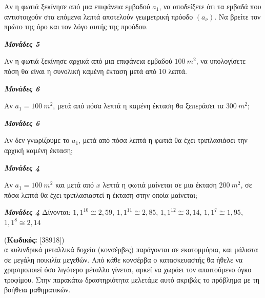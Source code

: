 \documentclass[11pt,a4paper,twoside]{book}
\newcounter{askhsh}[chapter]
\renewcommand{\theaskhsh}{
	\bf{\titlefont{\Large{\thechapter}}.\arabic{askhsh}}
}
\newcommand{\Askhsh}[2]{\refstepcounter{askhsh}{\titlefont{Άσκηση\theaskhsh} - \textcolor{maincolor}{ΘΕΜΑ #2}} (\small{\textbf{Κωδικός:} #1})\\}{}
\newcommand{\monades}[1]{
\hspace*{\fill}
\textbf{\textit{\textcolor{maincolor}{Μονάδες #1}}}}
\begin{document}
\begin{alist}
\item Αν η φωτιά ξεκίνησε από μια επιφάνεια εμβαδού $a_1$, να αποδείξετε ότι τα εμβαδά που αντιστοιχούν στα επόμενα λεπτά αποτελούν γεωμετρική πρόοδο $(a_\nu)$. Να βρείτε τον πρώτο της όρο και τον λόγο αυτής της προόδου.
\monades{5}
\item Αν η φωτιά ξεκίνησε αρχικά από μια επιφάνεια εμβαδού $100\ m^2$, να υπολογίσετε πόση θα είναι η συνολική καμένη έκταση μετά από $10$ λεπτά.
\monades{6}
\item Αν $a_1 = 100\ m^2$, μετά από πόσα λεπτά η καμένη έκταση θα ξεπεράσει τα $300\ m^2$;
\monades{6}
\item
\begin{rlist}
\item Αν δεν γνωρίζουμε το $a_1$, μετά από πόσα λεπτά η φωτιά θα έχει τριπλασιάσει την αρχική καμένη έκταση;
\monades{4}
\item Αν $a_1 = 100\ m^2$ και μετά από $x$ λεπτά η φωτιά μαίνεται σε μια έκταση $200\ m^2$, σε πόσα λεπτά θα έχει τριπλασιαστεί η έκταση στην οποία μαίνεται;
\monades{4}
Δίνονται: $1{,}1^{10} \cong 2{,}59$, $1{,}1^{11} \cong 2{,}85$, $1{,}1^{12} \cong 3{,}14$, $1{,}1^{7} \cong 1{,}95$, $1{,}1^{8} \cong 2{,}14$
\end{rlist}
\end{alist}
\vspace{4mm}
\Askhsh{[38918]}
Τα κυλινδρικά μεταλλικά δοχεία (κονσέρβες) παράγονται σε εκατομμύρια, και μάλιστα σε μεγάλη ποικιλία μεγεθών. Από κάθε κονσέρβα ο κατασκευαστής θα ήθελε να χρησιμοποιεί όσο λιγότερο μέταλλο γίνεται, αρκεί να χωράει τον απαιτούμενο όγκο τροφίμου. Στην παρακάτω δραστηριότητα μελετάμε αυτό ακριβώς το πρόβλημα με τη βοήθεια μαθηματικών.
\begin{marginfigure}[0cm]

\end{marginfigure}
\end{document}
